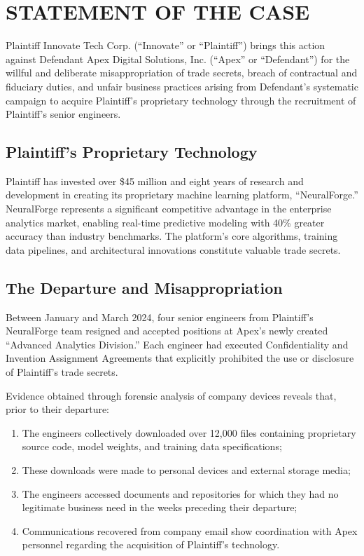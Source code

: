 \documentclass[
    language=english,
    doctype=legal-brief,
    institution=none,
]{../../omnilatex}
\begin{document}
\section{STATEMENT OF THE CASE}

Plaintiff Innovate Tech Corp. (``Innovate'' or ``Plaintiff'') brings this action against Defendant Apex Digital Solutions, Inc. (``Apex'' or ``Defendant'') for the willful and deliberate misappropriation of trade secrets, breach of contractual and fiduciary duties, and unfair business practices arising from Defendant's systematic campaign to acquire Plaintiff's proprietary technology through the recruitment of Plaintiff's senior engineers.

\subsection{Plaintiff's Proprietary Technology}
Plaintiff has invested over \$45 million and eight years of research and development in creating its proprietary machine learning platform, ``NeuralForge.'' NeuralForge represents a significant competitive advantage in the enterprise analytics market, enabling real-time predictive modeling with 40\% greater accuracy than industry benchmarks. The platform's core algorithms, training data pipelines, and architectural innovations constitute valuable trade secrets.

\subsection{The Departure and Misappropriation}
Between January and March 2024, four senior engineers from Plaintiff's NeuralForge team resigned and accepted positions at Apex's newly created ``Advanced Analytics Division.'' Each engineer had executed Confidentiality and Invention Assignment Agreements that explicitly prohibited the use or disclosure of Plaintiff's trade secrets.

Evidence obtained through forensic analysis of company devices reveals that, prior to their departure:
\begin{enumerate}[label=(\alph*)]
    \item The engineers collectively downloaded over 12,000 files containing proprietary source code, model weights, and training data specifications;
    \item These downloads were made to personal devices and external storage media;
    \item The engineers accessed documents and repositories for which they had no legitimate business need in the weeks preceding their departure;
    \item Communications recovered from company email show coordination with Apex personnel regarding the acquisition of Plaintiff's technology.
\end{enumerate}
\end{document}
